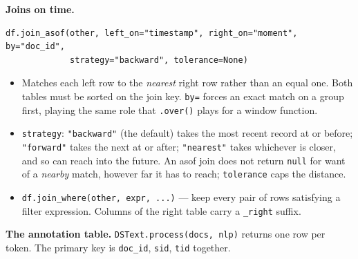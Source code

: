 \documentclass[11pt, a4paper]{article}
\newcommand{\code}[1]{\texttt{#1}}
\begin{document}
\smallskip

\textbf{Joins on time.}

\begin{verbatim}
df.join_asof(other, left_on="timestamp", right_on="moment", by="doc_id",
             strategy="backward", tolerance=None)
\end{verbatim}

\begin{itemize}
  \item Matches each left row to the \textit{nearest} right row rather than an equal one. Both
        tables must be sorted on the join key. \code{by=} forces an exact match on a group
        first, playing the same role that \code{.over()} plays for a window function.
  \item \code{strategy}: \code{"backward"} (the default) takes the most recent record at or
        before; \code{"forward"} takes the next at or after; \code{"nearest"} takes whichever
        is closer, and so can reach into the future. An asof join does not return \code{null}
        for want of a \textit{nearby} match, however far it has to reach; \code{tolerance}
        caps the distance.
  \item \code{df.join\_where(other, expr, ...)} --- keep every pair of rows satisfying a
        filter expression. Columns of the right table carry a \code{\_right} suffix.
\end{itemize}

\smallskip

\textbf{The annotation table.}
\code{DSText.process(docs, nlp)} returns one row per token. The primary key is
\code{doc\_id}, \code{sid}, \code{tid} together.
\end{document}
